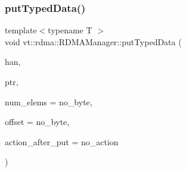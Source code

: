 \mbox{\label{structvt_1_1rdma_1_1_r_d_m_a_manager_a553764f2d91b42cf97991bbeadb75a5c}} 
\subsubsection{\texorpdfstring{put\+Typed\+Data()}{putTypedData()}\hspace{0.1cm}{\footnotesize\ttfamily [2/2]}}
{\footnotesize\ttfamily template$<$typename T $>$ \\
void vt\+::rdma\+::\+R\+D\+M\+A\+Manager\+::put\+Typed\+Data (\begin{DoxyParamCaption}\item[{\hyperlink{namespacevt_a10442579ec4e7ebef223818e64bcf908}{R\+D\+M\+A\+\_\+\+Handle\+Type} const \&}]{han,  }\item[{T}]{ptr,  }\item[{\hyperlink{namespacevt_aab8d55968084610ce3b17057981e9300}{Byte\+Type} const \&}]{num\+\_\+elems = {\ttfamily no\+\_\+byte},  }\item[{\hyperlink{namespacevt_aab8d55968084610ce3b17057981e9300}{Byte\+Type} const \&}]{offset = {\ttfamily no\+\_\+byte},  }\item[{\hyperlink{namespacevt_ae0a5a7b18cc99d7b732cb4d44f46b0f3}{Action\+Type}}]{action\+\_\+after\+\_\+put = {\ttfamily no\+\_\+action} }\end{DoxyParamCaption})\hspace{0.3cm}{\ttfamily [inline]}}

\mbox{\label{structvt_1_1rdma_1_1_r_d_m_a_manager_ad851bdc250182163eb4996888ba1b863}} 
